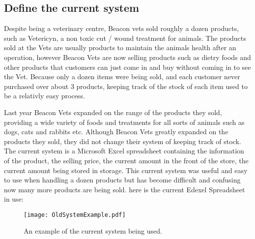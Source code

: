 \subsection{Define the current system}

\begin{flushleft}
Despite being a veterinary centre, Beacon vets sold roughly a dozen products, such as Vetericyn, a non toxic cut / wound treatment for animals. The products sold at the Vets are usually products to maintain the animals health after an operation, however Beacon Vets are now selling products such as dietry foods and other products that customers can just come in and buy without coming  in to see the Vet. Because only a dozen items were being sold, and each customer never purchased over about 3 products, keeping track of the stock of each item used to be a relativly easy process. \par

Last year Beacon Vets expanded on the range of the products they sold, providing a wide variety of foods and treatments for all sorts of animals such as dogs, cats and rabbits etc. Although Beacon Vets greatly expanded on the products they sold, they did not change their system of keeping track of stock. The current system is a Microsoft Excel spreadsheet containing the information of the product, the selling price, the current amount in the front of the store, the current amount being stored in storage. This current system was useful and easy to use when handling a dozen products but has become difficult and confusing now many more products are being sold. here is the current Edexel Spreadsheet in use:\par

\end{flushleft}


\begin{figure}[H]

\hfill\texttt{[image: OldSystemExample.pdf]}\hspace*{\fill}
\caption{An example of the current system being used.} \label{fig:Example Of Old System}
\end{figure}

